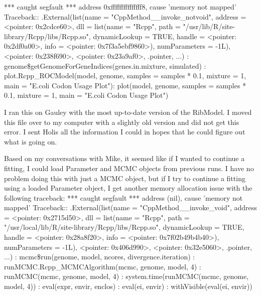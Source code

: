 \documentclass[11pt]{labbook}
\begin{document}
*** caught segfault ***
address 0xfffffffffffffff8, cause 'memory not mapped'
\newline
Traceback:: .External(list(name = "CppMethod\_\_invoke\_notvoid", address = <pointer: 0x2cdce60>,     dll = list(name = "Rcpp", path = "/usr/lib/R/site-library/Rcpp/libs/Rcpp.so",         dynamicLookup = TRUE, handle = <pointer: 0x2df0a00>,         info = <pointer: 0x7f3a5ebf9860>), numParameters = -1L),     <pointer: 0x238f690>, <pointer: 0x23a9af0>, .pointer, ...)
: genome\$getGenomeForGeneIndices(genes.in.mixture, simulated)
: plot.Rcpp\_ROCModel(model, genome, samples = samples * 0.1, mixture = 1,     main = "E.coli Codon Usage Plot"): plot(model, genome, samples = samples * 0.1, mixture = 1, main = "E.coli Codon Usage Plot")
 \newline
 
I ran this on Gauley with the most up-to-date version of the RibModel. I moved this file over to my computer with a slightly old version and did not get this error. I sent Holis all the information I could in hopes that he could figure out what is going on.

Based on my conversations with Mike, it seemed like if I wanted to continue a fitting, I could load Parameter and MCMC objects from previous runs. I have no problem doing this with just a MCMC object, but if I try to continue a fitting using a loaded Parameter object, I get another memory allocation issue with the following traceback:
\newline
 *** caught segfault ***
address (nil), cause 'memory not mapped'
\newline
Traceback:: .External(list(name = "CppMethod\_\_invoke\_void", address = <pointer: 0x2715d50>,     dll = list(name = "Rcpp", path = "/usr/local/lib/R/site-library/Rcpp/libs/Rcpp.so",         dynamicLookup = TRUE, handle = <pointer: 0x28a8f20>,         info = <pointer: 0x7f02b49b4b40>), numParameters = -1L),     <pointer: 0x406d990>, <pointer: 0x32e5060>, .pointer, ...)
: mcmc\$run(genome, model, ncores, divergence.iteration)
: runMCMC.Rcpp\_MCMCAlgorithm(mcmc, genome, model, 4)
: runMCMC(mcmc, genome, model, 4)
: system.time(runMCMC(mcmc, genome, model, 4))
: eval(expr, envir, enclos)
: eval(ei, envir)
: withVisible(eval(ei, envir))
\newline
\end{document}
